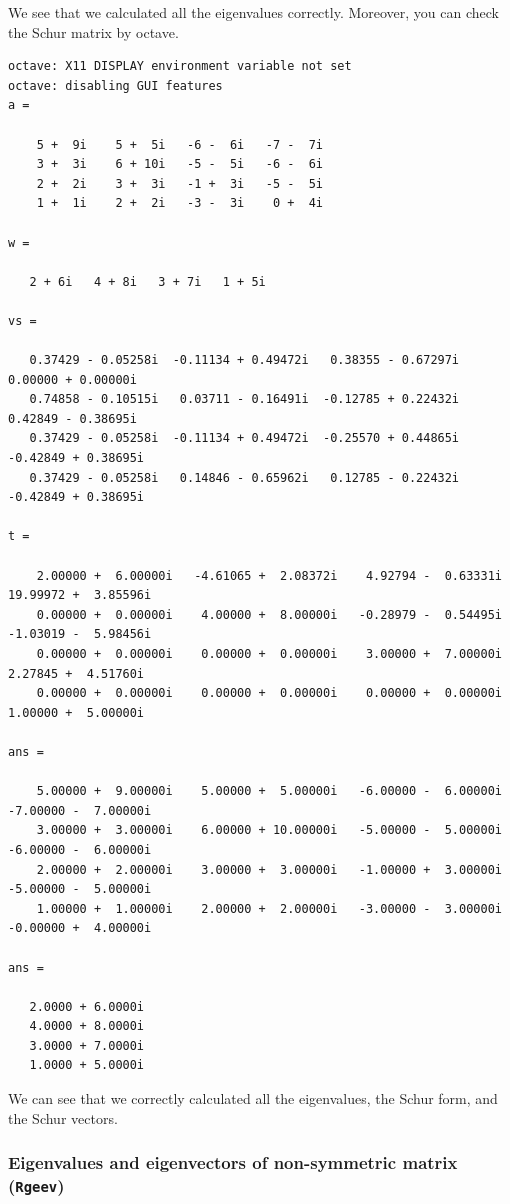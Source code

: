 \documentclass[12pt]{article}
\begin{document}
We see that we calculated all the eigenvalues correctly. Moreover, you can check the Schur matrix by octave.
{\footnotesize
\begin{verbatim}
octave: X11 DISPLAY environment variable not set
octave: disabling GUI features
a =

    5 +  9i    5 +  5i   -6 -  6i   -7 -  7i
    3 +  3i    6 + 10i   -5 -  5i   -6 -  6i
    2 +  2i    3 +  3i   -1 +  3i   -5 -  5i
    1 +  1i    2 +  2i   -3 -  3i    0 +  4i

w =

   2 + 6i   4 + 8i   3 + 7i   1 + 5i

vs =

   0.37429 - 0.05258i  -0.11134 + 0.49472i   0.38355 - 0.67297i   0.00000 + 0.00000i
   0.74858 - 0.10515i   0.03711 - 0.16491i  -0.12785 + 0.22432i   0.42849 - 0.38695i
   0.37429 - 0.05258i  -0.11134 + 0.49472i  -0.25570 + 0.44865i  -0.42849 + 0.38695i
   0.37429 - 0.05258i   0.14846 - 0.65962i   0.12785 - 0.22432i  -0.42849 + 0.38695i

t =

    2.00000 +  6.00000i   -4.61065 +  2.08372i    4.92794 -  0.63331i   19.99972 +  3.85596i
    0.00000 +  0.00000i    4.00000 +  8.00000i   -0.28979 -  0.54495i   -1.03019 -  5.98456i
    0.00000 +  0.00000i    0.00000 +  0.00000i    3.00000 +  7.00000i    2.27845 +  4.51760i
    0.00000 +  0.00000i    0.00000 +  0.00000i    0.00000 +  0.00000i    1.00000 +  5.00000i

ans =

    5.00000 +  9.00000i    5.00000 +  5.00000i   -6.00000 -  6.00000i   -7.00000 -  7.00000i
    3.00000 +  3.00000i    6.00000 + 10.00000i   -5.00000 -  5.00000i   -6.00000 -  6.00000i
    2.00000 +  2.00000i    3.00000 +  3.00000i   -1.00000 +  3.00000i   -5.00000 -  5.00000i
    1.00000 +  1.00000i    2.00000 +  2.00000i   -3.00000 -  3.00000i   -0.00000 +  4.00000i

ans =

   2.0000 + 6.0000i
   4.0000 + 8.0000i
   3.0000 + 7.0000i
   1.0000 + 5.0000i
\end{verbatim} }
We can see that we correctly calculated all the eigenvalues, the Schur form, and the Schur vectors.

\subsubsection{Eigenvalues and eigenvectors of non-symmetric matrix ({\tt Rgeev})}
\end{document}
